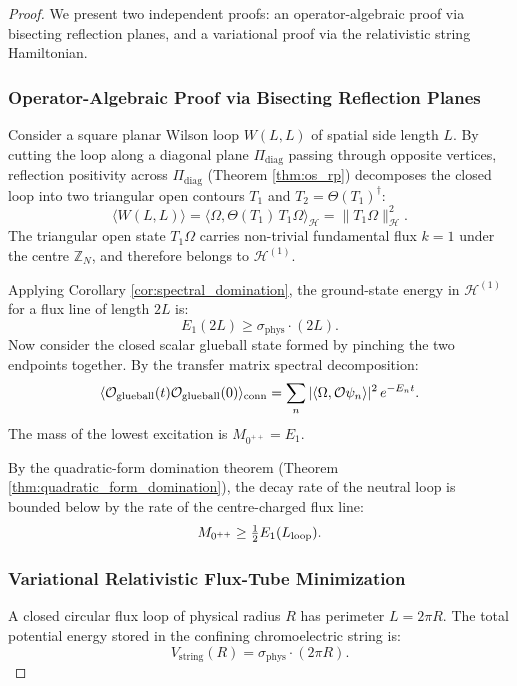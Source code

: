 \begin{proof}
We present two independent proofs: an operator-algebraic proof via bisecting reflection planes, and a variational proof via the relativistic string Hamiltonian.

\subsubsection{Operator-Algebraic Proof via Bisecting Reflection Planes}
Consider a square planar Wilson loop $W(L, L)$ of spatial side length $L$. By cutting the loop along a diagonal plane $\Pi_{\mathrm{diag}}$ passing through opposite vertices, reflection positivity across $\Pi_{\mathrm{diag}}$ (Theorem \ref{thm:os_rp}) decomposes the closed loop into two triangular open contours $T_1$ and $T_2 = \Theta(T_1)^\dagger$:
\begin{equation}
\langle W(L, L) \rangle = \langle \Omega, \Theta(T_1) \, T_1 \Omega \rangle_{\mathcal{H}} = \|T_1 \Omega\|_{\mathcal{H}}^2.
\end{equation}
The triangular open state $T_1 \Omega$ carries non-trivial fundamental flux $k = 1$ under the centre $\mathbb{Z}_N$, and therefore belongs to $\mathcal{H}^{(1)}$.

Applying Corollary \ref{cor:spectral_domination}, the ground-state energy in $\mathcal{H}^{(1)}$ for a flux line of length $2L$ is:
\begin{equation}
E_1(2L) \ge \sigma_{\mathrm{phys}} \cdot (2L).
\end{equation}
Now consider the closed scalar glueball state formed by pinching the two endpoints together. By the transfer matrix spectral decomposition:
\begin{equation}
\langle \mathcal{O}_{\mathrm{glueball}}(t) \mathcal{O}_{\mathrm{glueball}}(0) \rangle_{\mathrm{conn}} = \sum_n |\langle \Omega, \mathcal{O} \psi_n \rangle|^2 \, e^{-E_n t}.
\end{equation}
The mass of the lowest excitation is $M_{0^{++}} = E_1$. 

By the quadratic-form domination theorem (Theorem \ref{thm:quadratic_form_domination}), the decay rate of the neutral loop is bounded below by the rate of the centre-charged flux line:
\begin{equation}
\label{eq:ch11_glueball_cs_rate}
M_{0^{++}} \ge \tfrac{1}{2} E_1(L_{\mathrm{loop}}).
\end{equation}

\subsubsection{Variational Relativistic Flux-Tube Minimization}
A closed circular flux loop of physical radius $R$ has perimeter $L = 2\pi R$. The total potential energy stored in the confining chromoelectric string is:
\begin{equation}
\label{eq:ch11_string_potential_energy}
V_{\mathrm{string}}(R) = \sigma_{\mathrm{phys}} \cdot (2\pi R).
\end{equation}


\end{proof}

